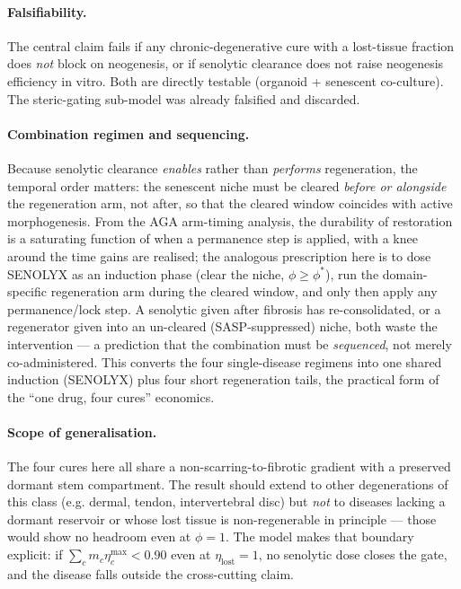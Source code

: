 \documentclass[11pt,a4paper]{article}
\begin{document}
\paragraph{Falsifiability.} The central claim fails if any chronic-degenerative cure with a
lost-tissue fraction does \emph{not} block on neogenesis, or if senolytic clearance does not
raise neogenesis efficiency in vitro. Both are directly testable (organoid + senescent
co-culture). The steric-gating sub-model was already falsified and discarded.

\paragraph{Combination regimen and sequencing.} Because senolytic clearance \emph{enables}
rather than \emph{performs} regeneration, the temporal order matters: the senescent niche must
be cleared \emph{before or alongside} the regeneration arm, not after, so that the cleared
window coincides with active morphogenesis. From the AGA arm-timing analysis, the durability
of restoration is a saturating function of when a permanence step is applied, with a knee
around the time gains are realised; the analogous prescription here is to dose SENOLYX as an
induction phase (clear the niche, $\phi\!\geq\!\phi^\ast$), run the domain-specific
regeneration arm during the cleared window, and only then apply any permanence/lock step. A
senolytic given after fibrosis has re-consolidated, or a regenerator given into an
un-cleared (SASP-suppressed) niche, both waste the intervention --- a prediction that the
combination must be \emph{sequenced}, not merely co-administered. This converts the four
single-disease regimens into one shared induction (SENOLYX) plus four short regeneration
tails, the practical form of the ``one drug, four cures'' economics.

\paragraph{Scope of generalisation.} The four cures here all share a non-scarring-to-fibrotic
gradient with a preserved dormant stem compartment. The result should extend to other
degenerations of this class (e.g. dermal, tendon, intervertebral disc) but \emph{not} to
diseases lacking a dormant reservoir or whose lost tissue is non-regenerable in principle ---
those would show no headroom even at $\phi=1$. The model makes that boundary explicit: if
$\sum_c m_c\eta_c^{\max}<0.90$ even at $\eta_{\text{lost}}=1$, no senolytic dose closes the
gate, and the disease falls outside the cross-cutting claim.
\end{document}
